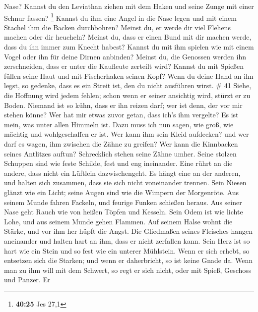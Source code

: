 Nase?  Kannst du den Leviathan ziehen mit dem Haken und
seine Zunge mit einer Schnur fassen? \footnote{\textbf{40:25} Jes 27,1}
 Kannst du ihm eine Angel in die Nase legen und mit einem
Stachel ihm die Backen durchbohren?  Meinst du, er werde
dir viel Flehens machen oder dir heucheln?  Meinst du,
dass er einen Bund mit dir machen werde, dass du ihn immer zum Knecht
habest?  Kannst du mit ihm spielen wie mit einem Vogel
oder ihn für deine Dirnen anbinden?  Meinst du, die
Genossen werden ihn zerschneiden, dass er unter die Kaufleute zerteilt
wird?  Kannst du mit Spießen füllen seine Haut und mit
Fischerhaken seinen Kopf?  Wenn du deine Hand an ihn
legst, so gedenke, dass es ein Streit ist, den du nicht ausführen wirst.
\# 41  Siehe, die Hoffnung wird jedem fehlen; schon wenn
er seiner ansichtig wird, stürzt er zu Boden.  Niemand ist
so kühn, dass er ihn reizen darf; wer ist denn, der vor mir stehen
könne?  Wer hat mir etwas zuvor getan, dass ich's ihm
vergelte? Es ist mein, was unter allen Himmeln ist.  Dazu
muss ich nun sagen, wie groß, wie mächtig und wohlgeschaffen er ist.
 Wer kann ihm sein Kleid aufdecken? und wer darf es wagen,
ihm zwischen die Zähne zu greifen?  Wer kann die
Kinnbacken seines Antlitzes auftun? Schrecklich stehen seine Zähne
umher.  Seine stolzen Schuppen sind wie feste Schilde,
fest und eng ineinander.  Eine rührt an die andere, dass
nicht ein Lüftlein dazwischengeht.  Es hängt eine an der
anderen, und halten sich zusammen, dass sie sich nicht voneinander
trennen.  Sein Niesen glänzt wie ein Licht; seine Augen
sind wie die Wimpern der Morgenröte.  Aus seinem Munde
fahren Fackeln, und feurige Funken schießen heraus.  Aus
seiner Nase geht Rauch wie von heißen Töpfen und Kesseln.
 Sein Odem ist wie lichte Lohe, und aus seinem Munde
gehen Flammen.  Auf seinem Halse wohnt die Stärke, und
vor ihm her hüpft die Angst.  Die Gliedmaßen seines
Fleisches hangen aneinander und halten hart an ihm, dass er nicht
zerfallen kann.  Sein Herz ist so hart wie ein Stein und
so fest wie ein unterer Mühlstein.  Wenn er sich erhebt,
so entsetzen sich die Starken; und wenn er daherbricht, so ist keine
Gnade da.  Wenn man zu ihm will mit dem Schwert, so regt
er sich nicht, oder mit Spieß, Geschoss und Panzer.  Er
